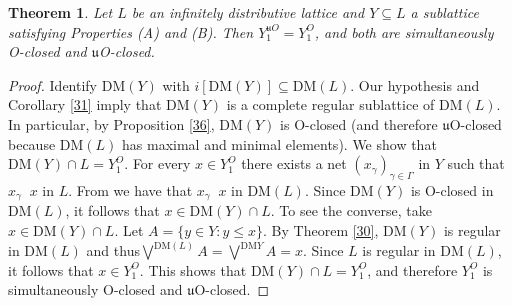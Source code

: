 \documentclass[12pt,a4paper]{amsart}
\numberwithin{equation}{section}
\newtheorem{thm}{Theorem}
\theoremstyle{definition}
\newcommand{\sss}[1]{{\scriptscriptstyle #1}}
\newcommand{\converges}[1]{\mathop{\overset{\text{#1}}{\longrightarrow}}}
\newcommand{\lbigvee}[1]{\bigvee^{\scriptscriptstyle #1}}
\newcommand{\DM}{\text{DM}}
\begin{document}
\begin{thm}\label{n}
Let $L$ be an infinitely distributive lattice and $Y \subseteq L$ a sublattice satisfying Properties (A) and (B). Then $Y^{\sss{\mathfrak{u}{O}}}_1=Y^{\sss{{O}}}_1$, and both are simultaneously O-closed and $\mathfrak{u}$O-closed.
\end{thm}
\begin{proof}
Identify $\DM(Y)$ with $i[\DM(Y)]\subseteq \DM(L)$.   Our hypothesis and Corollary \ref{31} imply that $\DM(Y)$ is a complete regular sublattice of $\DM(L)$.  In particular, by Proposition \ref{36}, $\DM(Y)$ is O-closed (and therefore $\mathfrak{u}$O-closed because $\DM(L)$ has  maximal and minimal elements).  We show that $\DM(Y) \cap L =
	Y^{\sss O}_{1}$.   For every $x \in Y^{\sss O}_{1}$ there exists a net
	$(x_\gamma)_{\gamma\in\Gamma}$ in $Y$ such that $x_{\gamma} \converges{O}
	x$ in $L$. From \cite[Theorem 3]{KAECWH} we have that $x_{\gamma} \converges{O} x$ in $\DM(L)$.  Since $\DM(Y)$ is O-closed in $\DM(L)$, it follows that  $x \in \DM(Y)\cap L$. To see the converse, take $x \in \DM(Y) \cap L$. Let $A = \{y \in Y : y \leq x \}$.  By Theorem \ref{30}, $\DM(Y)$ is regular in $\DM(L)$ and thus$\lbigvee{\DM(L)}A=\lbigvee{\DM{Y}}A= x$.  Since $L$ is regular in $\DM(L)$, it follows that $x\in Y^{\sss O}_{1}$.  This shows that $\DM(Y) \cap L =
	Y^{\sss O}_{1}$, and therefore $Y^{\sss O}_{1}$ is simultaneously O-closed and $\mathfrak{u}$O-closed.
\end{proof}
\end{document}
